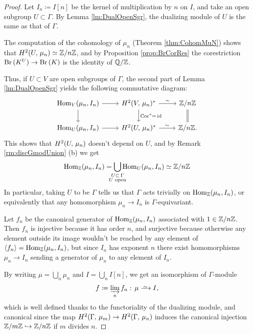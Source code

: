 \documentclass[a4paper, oneside]{memoir}
\begin{document}
\begin{proof}
	Let $I_n\coloneqq I[n]$ be the kernel of multiplication by $n$ on $I$, and take an open subgroup $U\subset\Gamma$. By Lemma \ref{lm:DualOpenSgr}, the dualizing module of $U$ is the same as that of $\Gamma$.

	The computation of the cohomology of $\mu_n$ (Theorem \ref{thm:CohomMuN}) shows that \(H^{2}( U, \, \mu_n )\simeq\mathbb{Z}/n\mathbb{Z}\), and by Proposition \ref{prop:BrCorRes} the corestriction $\operatorname{Br}{(K^U)}\to\operatorname{Br}{(K)}$ is the identity of $\mathbb{Q}/\mathbb{Z}$.

	Thus, if $U\subset V$ are open subgroups of $\Gamma$, the second part of Lemma \ref{lm:DualOpenSgr} yields the following commutative diagram:
	\begin{equation}\label{eq:FuncDual}
		\begin{tikzcd}
			\Hom_V(\mu_n,I_n)
			\ar[d]
			\ar[r] &
			\H{2}{V}{\mu_n}^*
			\ar[d, "\Cor^*=\,\id"]
			\rar["\sim"] &
			\Zn
			\ar[equal, d] \\
			\Hom_U(\mu_n,I_n)
			\ar[r] &
			\H{2}{U}{\mu_n}^*
			\rar["\sim"] &
			\Zn.
		\end{tikzcd}
	\end{equation}
	This shows that \(H^{2}( U, \, \mu_n )\) doesn't depend on \(U\), and by Remark \ref{rm:discGmodUnion} (b) we get
	\[
		\Hom_\Z(\mu_n,I_n)=\bigcup_{\mathclap{\substack{U\subset\,\Gamma\\U\text{ open}}}}{\Hom_U(\mu_n,I_n)}\simeq\Zn
	\]
	In particular, taking $U$ to be $\Gamma$ tells us that $\Gamma$ acts trivially on $\operatorname{Hom}_{\mathbb{Z}}(\mu_n,I_n)$, or equivalently that any homomorphism $\mu_n\to I_n$ is $\Gamma$-equivariant.

	Let $f_n$ be the canonical generator of $\operatorname{Hom}_{\mathbb{Z}}(\mu_n,I_n)$ associated with $1\in\mathbb{Z}/n\mathbb{Z}$. Then $f_n$ is injective because it has order $n$, and surjective because otherwise any
	element outside its image wouldn't be reached by any element of $\langle f_n\rangle=\operatorname{Hom}_{\mathbb{Z}}(\mu_n,I_n)$, but since $I_n$ has exponent $n$ there exist homomorphisms $\mu_n\to I_n$ sending a generator of $\mu_n$ to any element of $I_n$.

	By writing $\mu = \bigcup_n{\mu_n}$ and $I = \bigcup_n{I[n]}$, we get an isomorphism of $\Gamma$-module
	\[
		f\coloneqq \varinjlim_n f_n:\, \mu\Iso I,
	\]
	which is well defined thanks to the functoriality of the dualizing
	module, and canonical since the map $H^{2}( \Gamma, \, \mu_m )\to H^{2}( \Gamma, \, \mu_n )$ induces the canonical injection $\mathbb{Z}/m\mathbb{Z}\hookrightarrow\mathbb{Z}/n\mathbb{Z}$ if $m$ divides $n$.
\end{proof}
\end{document}
